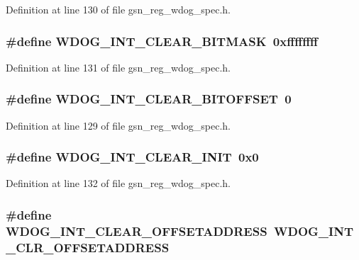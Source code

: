 Definition at line 130 of file gsn\_\-reg\_\-wdog\_\-spec.h.

\hypertarget{a00577_aeda73ee35febffb7c0b08249b613d4d9}{
\subsubsection[{WDOG\_\-INT\_\-CLEAR\_\-BITMASK}]{\setlength{\rightskip}{0pt plus 5cm}\#define WDOG\_\-INT\_\-CLEAR\_\-BITMASK~0xffffffff}}
\label{a00577_aeda73ee35febffb7c0b08249b613d4d9}


Definition at line 131 of file gsn\_\-reg\_\-wdog\_\-spec.h.

\hypertarget{a00577_a2a86bf0a87fa3a56e5d54b47b6b25ea1}{
\subsubsection[{WDOG\_\-INT\_\-CLEAR\_\-BITOFFSET}]{\setlength{\rightskip}{0pt plus 5cm}\#define WDOG\_\-INT\_\-CLEAR\_\-BITOFFSET~0}}
\label{a00577_a2a86bf0a87fa3a56e5d54b47b6b25ea1}


Definition at line 129 of file gsn\_\-reg\_\-wdog\_\-spec.h.

\hypertarget{a00577_a7f1a1e366bad18c60ee0c2f2e35421cb}{
\subsubsection[{WDOG\_\-INT\_\-CLEAR\_\-INIT}]{\setlength{\rightskip}{0pt plus 5cm}\#define WDOG\_\-INT\_\-CLEAR\_\-INIT~0x0}}
\label{a00577_a7f1a1e366bad18c60ee0c2f2e35421cb}


Definition at line 132 of file gsn\_\-reg\_\-wdog\_\-spec.h.

\hypertarget{a00577_a9c0e12573e926f3b188b01972d72c8ad}{
\subsubsection[{WDOG\_\-INT\_\-CLEAR\_\-OFFSETADDRESS}]{\setlength{\rightskip}{0pt plus 5cm}\#define WDOG\_\-INT\_\-CLEAR\_\-OFFSETADDRESS~WDOG\_\-INT\_\-CLR\_\-OFFSETADDRESS}}
\label{a00577_a9c0e12573e926f3b188b01972d72c8ad}


